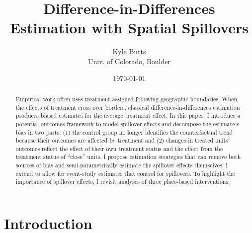 \documentclass[11pt]{article}
\title{\color{navyblue} Difference-in-Differences Estimation with Spatial Spillovers}
\author{\normalsize Kyle Butts\\{\footnotesize Univ. of Colorado, Boulder}}
\date{\footnotesize\today}
\begin{document}
\begin{titlepage}
    \maketitle
    
    \begin{abstract}
        Empirical work often uses treatment assigned following geographic boundaries. When the effects of treatment cross over borders, classical difference-in-differences estimation produces biased estimates for the average treatment effect. In this paper, I introduce a potential outcomes framework to model spillover effects and decompose the estimate's bias in two parts: (1) the control group no longer identifies the counterfactual trend because their outcomes are affected by treatment and (2) changes in treated units' outcomes reflect the effect of their own treatment status and the effect from the treatment status of ``close'' units. I propose estimation strategies that can remove both sources of bias and semi-parametrically estimate the spillover effects themselves. I extend \citet{Callaway_SantAnna_2020} to allow for event-study estimates that control for spillovers. To highlight the importance of spillover effects, I revisit analyses of three place-based interventions. 
    \end{abstract}
\end{titlepage}



\section{Introduction}
\end{document}
